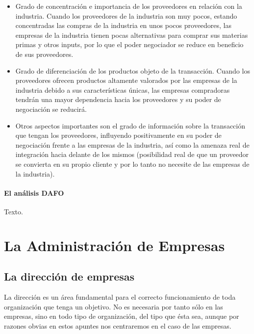 \documentclass[
]{krantz}
\providecommand{\tightlist}{%
  \setlength{\itemsep}{0pt}\setlength{\parskip}{0pt}}
\begin{document}
\begin{itemize}
\tightlist
\item
  Grado de concentración e importancia de los proveedores en relación con la industria. Cuando los proveedores de la industria son muy pocos, estando concentradas las compras de la industria en unos pocos proveedores, las empresas de la industria tienen pocas alternativas para comprar sus materias primas y otros inputs, por lo que el poder negociador se reduce en beneficio de sus proveedores.
\item
  Grado de diferenciación de los productos objeto de la transacción. Cuando los proveedores ofrecen productos altamente valorados por las empresas de la industria debido a sus características únicas, las empresas compradoras tendrán una mayor dependencia hacia los proveedores y su poder de negociación se reducirá.
\item
  Otros aspectos importantes son el grado de información sobre la transacción que tengan los proveedores, influyendo positivamente en su poder de negociación frente a las empresas de la industria, así como la amenaza real de integración hacia delante de los mismos (posibilidad real de que un proveedor se convierta en su propio cliente y por lo tanto no necesite de las empresas de la industria).
\end{itemize}

\hypertarget{el-anuxe1lisis-dafo}{%
\subsection{El análisis DAFO}\label{el-anuxe1lisis-dafo}}

Texto.

\hypertarget{part-la-administraciuxf3n-de-empresas}{%
\part{La Administración de Empresas}\label{part-la-administraciuxf3n-de-empresas}}

\hypertarget{la-direcciuxf3n-de-empresas}{%
\chapter{La dirección de empresas}\label{la-direcciuxf3n-de-empresas}}

La dirección es un área fundamental para el correcto funcionamiento de toda organización que tenga un objetivo. No es necesaria por tanto sólo en las empresas, sino en todo tipo de organización, del tipo que ésta sea, aunque por razones obvias en estos apuntes nos centraremos en el caso de las empresas.
\end{document}
